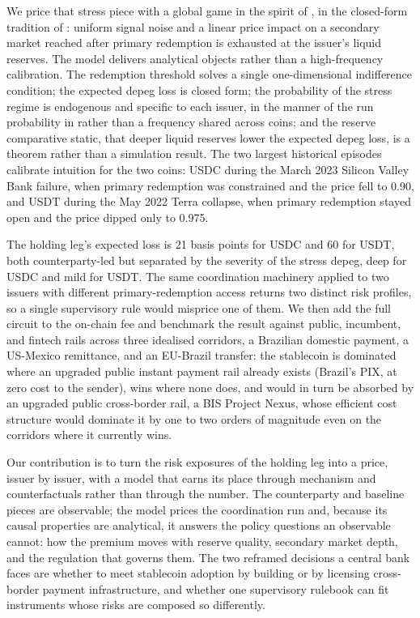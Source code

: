 We price that stress piece with a global game in the spirit of \citet{morris_shin_1998}, in the closed-form tradition of \citet{klee_etal_2026_fragility}: uniform signal noise and a linear price impact on a secondary market reached after primary redemption is exhausted at the issuer's liquid reserves. The model delivers analytical objects rather than a high-frequency calibration. The redemption threshold solves a single one-dimensional indifference condition; the expected depeg loss is closed form; the probability of the stress regime is endogenous and specific to each issuer, in the manner of the run probability in \citet{klee_etal_2026_fragility} rather than a frequency shared across coins; and the reserve comparative static, that deeper liquid reserves lower the expected depeg loss, is a theorem rather than a simulation result. The two largest historical episodes calibrate intuition for the two coins: USDC during the March 2023 Silicon Valley Bank failure, when primary redemption was constrained and the price fell to 0.90, and USDT during the May 2022 Terra collapse, when primary redemption stayed open and the price dipped only to 0.975.

The holding leg's expected loss is 21 basis points for USDC and 60 for USDT, both counterparty-led but separated by the severity of the stress depeg, deep for USDC and mild for USDT. The same coordination machinery applied to two issuers with different primary-redemption access returns two distinct risk profiles, so a single supervisory rule would misprice one of them. We then add the full circuit to the on-chain fee and benchmark the result against public, incumbent, and fintech rails across three idealised corridors, a Brazilian domestic payment, a US-Mexico remittance, and an EU-Brazil transfer: the stablecoin is dominated where an upgraded public instant payment rail already exists (Brazil's PIX, at zero cost to the sender), wins where none does, and would in turn be absorbed by an upgraded public cross-border rail, a BIS Project Nexus, whose efficient cost structure would dominate it by one to two orders of magnitude even on the corridors where it currently wins.

Our contribution is to turn the risk exposures of the holding leg into a price, issuer by issuer, with a model that earns its place through mechanism and counterfactuals rather than through the number. The counterparty and baseline pieces are observable; the model prices the coordination run and, because its causal properties are analytical, it answers the policy questions an observable cannot: how the premium moves with reserve quality, secondary market depth, and the regulation that governs them. The two reframed decisions a central bank faces are whether to meet stablecoin adoption by building or by licensing cross-border payment infrastructure, and whether one supervisory rulebook can fit instruments whose risks are composed so differently.

